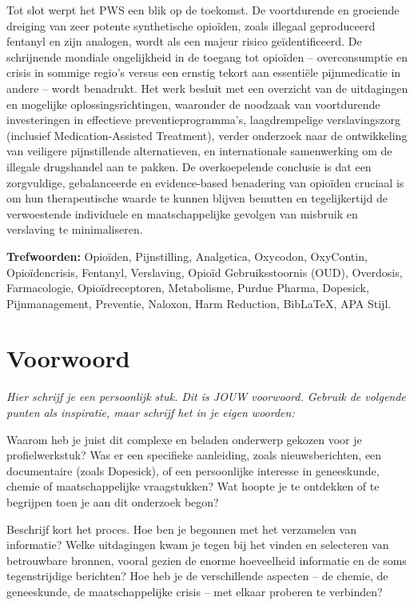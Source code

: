 \documentclass[11pt, a4paper]{report} %
\begin{document}
Tot slot werpt het PWS een blik op de toekomst. De voortdurende en groeiende dreiging van zeer potente synthetische opioïden, zoals illegaal geproduceerd fentanyl en zijn analogen, wordt als een majeur risico geïdentificeerd. De schrijnende mondiale ongelijkheid in de toegang tot opioïden – overconsumptie en crisis in sommige regio's versus een ernstig tekort aan essentiële pijnmedicatie in andere – wordt benadrukt. Het werk besluit met een overzicht van de uitdagingen en mogelijke oplossingsrichtingen, waaronder de noodzaak van voortdurende investeringen in effectieve preventieprogramma's, laagdrempelige verslavingszorg (inclusief Medication-Assisted Treatment), verder onderzoek naar de ontwikkeling van veiligere pijnstillende alternatieven, en internationale samenwerking om de illegale drugshandel aan te pakken. De overkoepelende conclusie is dat een zorgvuldige, gebalanceerde en evidence-based benadering van opioïden cruciaal is om hun therapeutische waarde te kunnen blijven benutten en tegelijkertijd de verwoestende individuele en maatschappelijke gevolgen van misbruik en verslaving te minimaliseren.

\vspace{2cm} %
\textbf{Trefwoorden:} Opioïden, Pijnstilling, Analgetica, Oxycodon, OxyContin, Opioïdencrisis, Fentanyl, Verslaving, Opioïd Gebruiksstoornis (OUD), Overdosis, Farmacologie, Opioïdreceptoren, Metabolisme, Purdue Pharma, Dopesick, Pijnmanagement, Preventie, Naloxon, Harm Reduction, BibLaTeX, APA Stijl.

\chapter*{Voorwoord}

\textit{Hier schrijf je een persoonlijk stuk. Dit is JOUW voorwoord. Gebruik de volgende punten als inspiratie, maar schrijf het in je eigen woorden:}

Waarom heb je juist dit complexe en beladen onderwerp gekozen voor je profielwerkstuk? Was er een specifieke aanleiding, zoals nieuwsberichten, een documentaire (zoals Dopesick), of een persoonlijke interesse in geneeskunde, chemie of maatschappelijke vraagstukken? Wat hoopte je te ontdekken of te begrijpen toen je aan dit onderzoek begon?

Beschrijf kort het proces. Hoe ben je begonnen met het verzamelen van informatie? Welke uitdagingen kwam je tegen bij het vinden en selecteren van betrouwbare bronnen, vooral gezien de enorme hoeveelheid informatie en de soms tegenstrijdige berichten? Hoe heb je de verschillende aspecten – de chemie, de geneeskunde, de maatschappelijke crisis – met elkaar proberen te verbinden?
\end{document}
